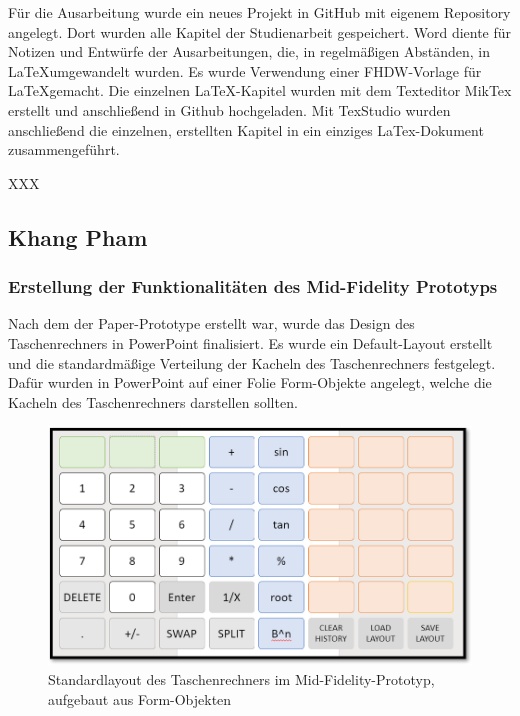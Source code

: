 Für die Ausarbeitung wurde ein neues Projekt in GitHub mit eigenem Repository angelegt. Dort wurden alle Kapitel der Studienarbeit gespeichert. Word diente für Notizen und Entwürfe der Ausarbeitungen, die, in regelmäßigen Abständen, in \LaTeX umgewandelt wurden. Es wurde Verwendung einer FHDW-Vorlage für \LaTeX gemacht. Die einzelnen \LaTeX-Kapitel wurden mit dem Texteditor MikTex erstellt und anschließend in Github hochgeladen. Mit TexStudio wurden anschließend die einzelnen, erstellten Kapitel in ein einziges LaTex-Dokument zusammengeführt.  

XXX

\clearpage

\subsection{Khang Pham}

\subsubsection{Erstellung der Funktionalitäten des Mid-Fidelity Prototyps}
\label{subsubsection:erstellung-funktionalitäten-mid-fidelity}

Nach dem der Paper-Prototype erstellt war, wurde das Design des Taschenrechners in PowerPoint finalisiert. Es wurde ein Default-Layout erstellt und die standardmäßige Verteilung der Kacheln des Taschenrechners festgelegt. Dafür wurden in PowerPoint auf einer Folie Form-Objekte angelegt, welche die Kacheln des Taschenrechners darstellen sollten.

\begin{figure}[!h]
	\includegraphics[scale=1]{img/standardlayout-mid-fielty}
	\caption[Standardlayout des Taschenrechners im Mid-Fidelity-Prototyp, aufgebaut aus Form-Objekten]{Standardlayout des Taschenrechners im Mid-Fidelity-Prototyp, aufgebaut aus Form-Objekten\footnotemark}
\end{figure}
\FloatBarrier

